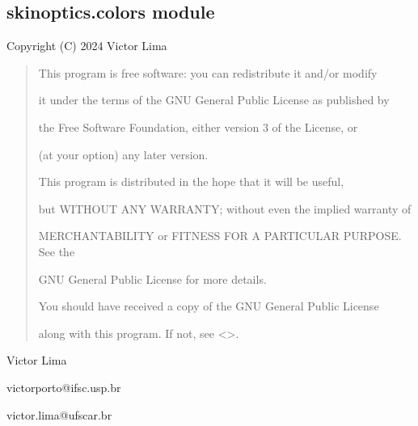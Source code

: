 \documentclass[letterpaper,10pt,english]{sphinxmanual}
\begin{document}
\sphinxstepscope


\subsection{skinoptics.colors module}
\label{\detokenize{07_colors:module-skinoptics.colors}}\label{\detokenize{07_colors:skinoptics-colors-module}}\label{\detokenize{07_colors::doc}}
\sphinxAtStartPar
Copyright (C) 2024 Victor Lima
\begin{quote}

\begin{DUlineblock}{0em}
\item[] This program is free software: you can redistribute it and/or modify
\item[] it under the terms of the GNU General Public License as published by
\item[] the Free Software Foundation, either version 3 of the License, or
\item[] (at your option) any later version.
\end{DUlineblock}

\begin{DUlineblock}{0em}
\item[] This program is distributed in the hope that it will be useful,
\item[] but WITHOUT ANY WARRANTY; without even the implied warranty of
\item[] MERCHANTABILITY or FITNESS FOR A PARTICULAR PURPOSE.  See the
\item[] GNU General Public License for more details.
\end{DUlineblock}

\begin{DUlineblock}{0em}
\item[] You should have received a copy of the GNU General Public License
\item[] along with this program.  If not, see \textless{}\textgreater{}.
\end{DUlineblock}
\end{quote}

\begin{DUlineblock}{0em}
\item[] Victor Lima
\item[] victorporto@ifsc.usp.br
\item[] victor.lima@ufscar.br
\end{DUlineblock}
\end{document}
